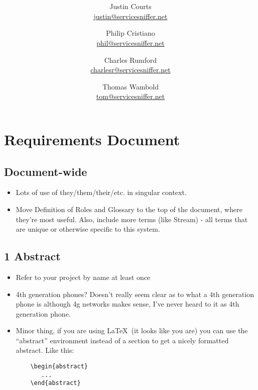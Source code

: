 \documentclass{article}
\title{\textbf{\mytitle}}
\author{
    Justin Courts \\\url{justin@servicesniffer.net}
    \and Philip Cristiano \\\url{phil@servicesniffer.net}
    \and Charles Rumford \\\url{charlesr@servicesniffer.net}
    \and Thomas Wambold \\\url{tom@servicesniffer.net}
}
\date{\mydate}
\begin{document}
\maketitle


\section{Requirements Document}

\subsection{Document-wide}

\begin{itemize}
    \item Lots of use of they/them/their/etc. in singular context.  
    \item Move Definition of Roles and Glossary to the top of the document,
        where they're most useful.  Also, include more terms (like Stream) -
        all terms that are unique or otherwise specific to this system.
\end{itemize}


\subsection{1 Abstract}

\begin{itemize}
    \item Refer to your project by name at least once
    \item 4th generation phones? Doesn't really seem clear as to what a 4th
        generation phone is although 4g networks makes sense, I've never heard
        to it as 4th generation phone.
    \item Minor thing, if you are using \LaTeX\ (it looks like you are) you can
        use the ``abstract'' environment instead of a section to get a nicely
        formatted abstract.  Like this:
    \begin{verbatim}
    \begin{abstract}
       ...
    \end{abstract}
    \end{verbatim}
\end{itemize}
\end{document}
